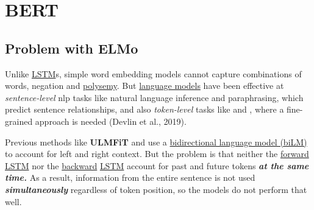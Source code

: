 \section{BERT} \label{sec:BERT}

\subsection{Problem with ELMo} \label{sec:ProblemWithELMo}

Unlike \hyperref[sec:LSTM]{LSTM}s, simple word embedding models cannot capture combinations of words, negation and \hyperref[sec:Polysemy]{polysemy}. But \hyperref[sec:LanguageModels]{language models} have been effective at \emph{sentence-level} nlp tasks like natural language inference and paraphrasing, which predict sentence relationships, and also \emph{token-level} tasks like  and , where a fine-grained approach is needed (Devlin et al., 2019).   

Previous methods like \textbf{ULMFiT} and  use a \hyperref[sec:BidirectionalLM]{bidirectional language model (biLM)} to account for left and right context. But the problem is that neither the \hyperref[sec:ForwardLM]{forward} \hyperref[sec:LSTM]{LSTM} nor the \hyperref[sec:BackwardLM]{backward} \hyperref[sec:LSTM]{LSTM} account for past and future tokens \textbf{\textit{at the same time.}} As a result, information from the entire sentence is not used \textbf{\emph{simultaneously}} regardless of token position, so the models do not perform that well. 

